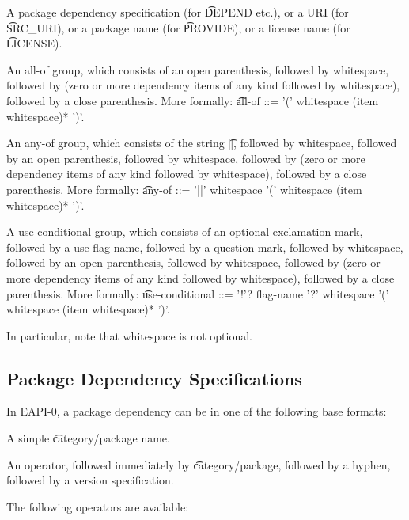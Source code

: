 \begin{bulletlist}
\item A package dependency specification (for \t{DEPEND} etc.), or a URI (for \t{SRC\_URI}),
    or a package name (for \t{PROVIDE}), or a license name (for \t{LICENSE}).
\item An all-of group, which consists of an open parenthesis, followed by whitespace,
    followed by (zero or more dependency items of any kind followed by whitespace), followed
    by a close parenthesis. More formally:
    \t{all-of ::= '(' whitespace (item whitespace)* ')'}.
\item An any-of group, which consists of the string \t{||}, followed by whitespace,
    followed by an open parenthesis, followed by whitespace, followed by (zero or more
    dependency items of any kind followed by whitespace), followed by a close parenthesis.
    More formally: \t{any-of ::= '||' whitespace '(' whitespace (item whitespace)* ')'}.
\item A use-conditional group, which consists of an optional exclamation mark, followed by
    a use flag name, followed by a question mark, followed by whitespace, followed by
    an open parenthesis, followed by whitespace, followed by (zero or more dependency items
    of any kind followed by whitespace), followed by a close parenthesis. More formally:
    \t{use-conditional ::= '!'? flag-name '?' whitespace '(' whitespace (item whitespace)* ')'}.
\end{bulletlist}

In particular, note that whitespace is not optional.

\subsection{Package Dependency Specifications}

In EAPI-0, a package dependency can be in one of the following base formats:

\begin{bulletlist}
\item A simple \t{category/package} name.
\item An operator, followed immediately by \t{category/package}, followed by a hyphen,
   followed by a version specification.
\end{bulletlist}


The following operators are available:

